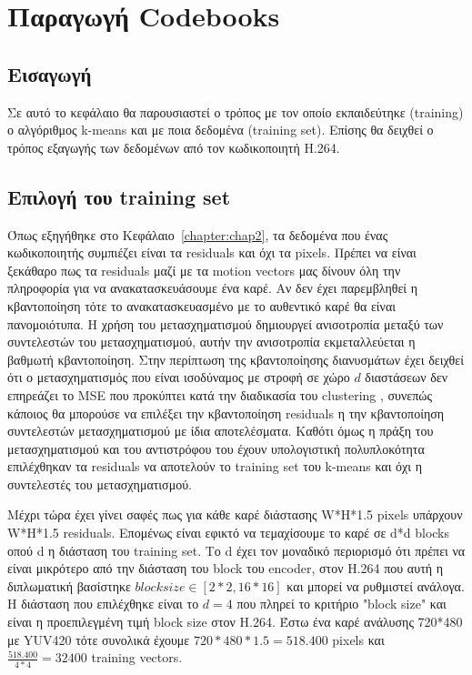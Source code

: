 ﻿\chapter{Παραγωγή Codebooks}
\label{chapter:chap4}

\section{Εισαγωγή}
\label{section:sect41}

\indent Σε αυτό το κεφάλαιο θα παρουσιαστεί ο τρόπος με τον οποίο εκπαιδεύτηκε (training) ο αλγόριθμος k-means  και με ποια δεδομένα (training set). Επίσης θα δειχθεί ο τρόπος εξαγωγής των δεδομένων από τον κωδικοποιητή H.264.

\section{Επιλογή του training set}
\label{section:sect42}

\indent Όπως εξηγήθηκε στο Κεφάλαιο~\ref{chapter:chap2}, τα δεδομένα που ένας κωδικοποιητής συμπιέζει είναι τα residuals και όχι τα pixels. Πρέπει να είναι ξεκάθαρο πως τα residuals μαζί με τα motion vectors μας δίνουν όλη την πληροφορία για να ανακατασκευάσουμε ένα καρέ. Αν δεν έχει παρεμβληθεί η κβαντοποίηση τότε το ανακατασκευασμένο με το αυθεντικό καρέ θα είναι πανομοιότυπα. Η χρήση του μετασχηματισμού δημιουργεί ανισοτροπία μεταξύ των συντελεστών του μετασχηματισμού, αυτήν την ανισοτροπία εκμεταλλεύεται η βαθμωτή κβαντοποίηση. Στην περίπτωση της κβαντοποίησης διανυσμάτων έχει δειχθεί ότι ο μετασχηματισμός που είναι ισοδύναμος με στροφή σε χώρο $d$ διαστάσεων δεν επηρεάζει το MSE που προκύπτει κατά την διαδικασία του clustering \cite{gersho}, συνεπώς κάποιος θα μπορούσε να επιλέξει την κβαντοποίηση residuals η την κβαντοποίηση συντελεστών μετασχηματισμού με ίδια αποτελέσματα. Καθότι όμως η πράξη του μετασχηματισμού και του αντιστρόφου του έχουν υπολογιστική πολυπλοκότητα επιλέχθηκαν τα residuals να αποτελούν το training set του k-means και όχι η συντελεστές του μετασχηματισμού.

\indent Μέχρι τώρα έχει γίνει σαφές πως για κάθε καρέ διάστασης W*H*1.5 pixels υπάρχουν W*H*1.5 residuals. Επομένως είναι εφικτό να τεμαχίσουμε το καρέ σε d*d blocks οπού d η διάσταση του training set. Το d έχει τον μοναδικό περιορισμό ότι πρέπει να είναι μικρότερο από την διάσταση του block του encoder, στον H.264 που αυτή η διπλωματική βασίστηκε $blocksize\in[2*2,16*16]$ και μπορεί να ρυθμιστεί ανάλογα. Η διάσταση που επιλέχθηκε είναι το $d=4$ που πληρεί το κριτήριο "block size" και είναι η προεπιλεγμένη τιμή block size στον H.264. Έστω ένα καρέ ανάλυσης 720*480 με YUV420 τότε συνολικά έχουμε $720*480*1.5=518.400$ pixels και $ \frac{518.400}{4*4} = 32400 $ training vectors.

